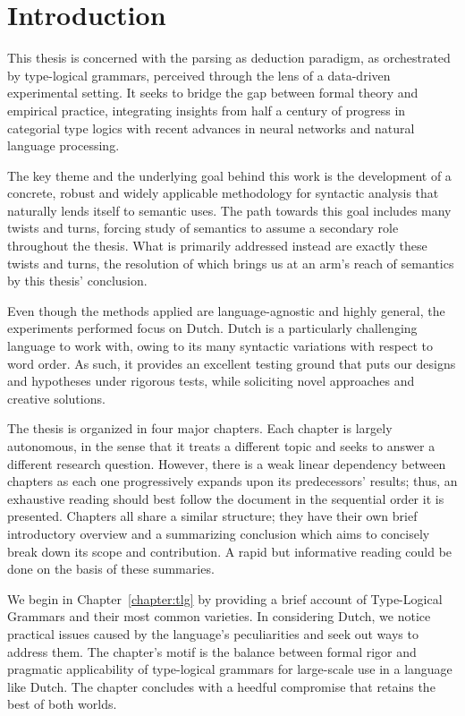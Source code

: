 \chapter{Introduction}
\label{chapter:intro}
This thesis is concerned with the parsing as deduction paradigm, as orchestrated by type-logical grammars, perceived through the lens of a data-driven experimental setting.
It seeks to bridge the gap between formal theory and empirical practice, integrating insights from half a century of progress in categorial type logics with recent advances in neural networks and natural language processing.

The key theme and the underlying goal behind this work is the development of a concrete, robust and widely applicable methodology for syntactic analysis that naturally lends itself to semantic uses.
The path towards this goal includes many twists and turns, forcing study of semantics to assume a secondary role throughout the thesis.
What is primarily addressed instead are exactly these twists and turns, the resolution of which brings us at an arm's reach of semantics by this thesis' conclusion.

Even though the methods applied are language-agnostic and highly general, the experiments performed focus on Dutch.
Dutch is a particularly challenging language to work with, owing to its many syntactic variations with respect to word order.
As such, it provides an excellent testing ground that puts our designs and hypotheses under rigorous tests, while soliciting novel approaches and creative solutions.

The thesis is organized in four major chapters.
Each chapter is largely autonomous, in the sense that it treats a different topic and seeks to answer a different research question.
However, there is a weak linear dependency between chapters as each one progressively expands upon its predecessors' results; thus, an exhaustive reading should best follow the document in the sequential order it is presented.
Chapters all share a similar structure; they have their own brief introductory overview and a summarizing conclusion which aims to concisely break down its scope and contribution.
A rapid but informative reading could be done on the basis of these summaries.

We begin in Chapter~\ref{chapter:tlg} by providing a brief account of Type-Logical Grammars and their most common varieties.
In considering Dutch, we notice practical issues caused by the language's peculiarities and seek out ways to address them.
The chapter's motif is the balance between formal rigor and pragmatic applicability of type-logical grammars for large-scale use in a language like Dutch.
The chapter concludes with a heedful compromise that retains the best of both worlds.

